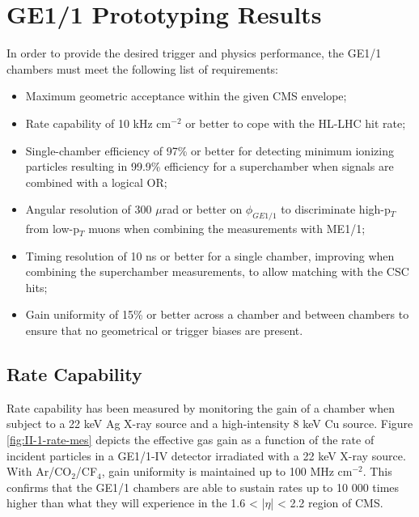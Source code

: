   \section{GE1/1 Prototyping Results}

    In order to provide the desired trigger and physics performance, the GE1/1 chambers must meet the following list of requirements:
    \begin{itemize}
      \item Maximum geometric acceptance within the given CMS envelope;
      \item Rate capability of 10 kHz cm$^{-2}$ or better to cope with the HL-LHC hit rate;
      \item Single-chamber efficiency of 97\% or better for detecting minimum ionizing particles resulting in 99.9\% efficiency for a superchamber when signals are combined with a logical OR;
      \item Angular resolution of 300 $\mu$rad or better on $ \phi_{GE1/1} $ to discriminate high-p$_T$ from low-p$_T$ muons when combining the measurements with ME1/1;
      \item Timing resolution of 10 ns or better for a single chamber, improving when combining the superchamber measurements, to allow matching with the CSC hits;
      \item Gain uniformity of 15\% or better across a chamber and between chambers to ensure that no geometrical or trigger biases are present. \\
    \end{itemize}

    \subsection{Rate Capability}

      Rate capability has been measured by monitoring the gain of a chamber when subject to a 22 keV Ag X-ray source and a high-intensity 8 keV Cu source. Figure \ref{fig:II-1-rate-mes} depicts the effective gas gain as a function of the rate of incident particles in a GE1/1-IV detector irradiated with a 22 keV X-ray source. With Ar/CO$_2$/CF$_4$, gain uniformity is maintained up to 100 MHz cm$^{-2}$. This confirms that the GE1/1 chambers are able to sustain rates up to 10 000 times higher than what they will experience in the 1.6 < |$\eta$| < 2.2 region of CMS. \\

